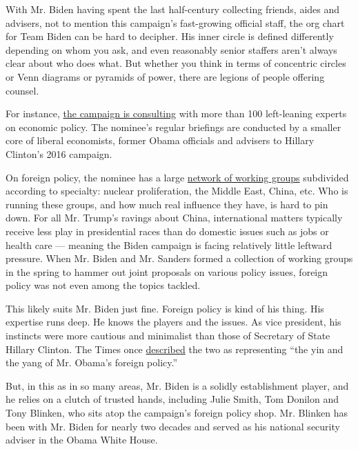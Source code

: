 With Mr. Biden having spent the last half-century collecting friends,
aides and advisers, not to mention this campaign's fast-growing official
staff, the org chart for Team Biden can be hard to decipher. His inner
circle is defined differently depending on whom you ask, and even
reasonably senior staffers aren't always clear about who does what. But
whether you think in terms of concentric circles or Venn diagrams or
pyramids of power, there are legions of people offering counsel.

For instance,
\href{https://www.nytimes3xbfgragh.onion/2020/06/11/us/politics/joe-biden-campaign-economy.html}{the
campaign is consulting} with more than 100 left-leaning experts on
economic policy. The nominee's regular briefings are conducted by a
smaller core of liberal economists, former Obama officials and advisers
to Hillary Clinton's 2016 campaign.

On foreign policy, the nominee has a large
\href{https://www.theatlantic.com/ideas/archive/2020/05/bidens-grand-ambitions-dont-extend-foreign-policy/611863/}{network
of working groups} subdivided according to specialty: nuclear
proliferation, the Middle East, China, etc. Who is running these groups,
and how much real influence they have, is hard to pin down. For all Mr.
Trump's ravings about China, international matters typically receive
less play in presidential races than do domestic issues such as jobs or
health care --- meaning the Biden campaign is facing relatively little
leftward pressure. When Mr. Biden and Mr. Sanders formed a collection of
working groups in the spring to hammer out joint proposals on various
policy issues, foreign policy was not even among the topics tackled.

This likely suits Mr. Biden just fine. Foreign policy is kind of his
thing. His expertise runs deep. He knows the players and the issues. As
vice president, his instincts were more cautious and minimalist than
those of Secretary of State Hillary Clinton. The Times once
\href{https://www.nytimes3xbfgragh.onion/2015/10/10/us/politics/a-biden-run-would-expose-foreign-policy-differences-with-hillary-clinton.html}{described}
the two as representing ``the yin and the yang of Mr. Obama's foreign
policy.''

But, in this as in so many areas, Mr. Biden is a solidly establishment
player, and he relies on a clutch of trusted hands, including Julie
Smith, Tom Donilon and Tony Blinken, who sits atop the campaign's
foreign policy shop. Mr. Blinken has been with Mr. Biden for nearly two
decades and served as his national security adviser in the Obama White
House.

